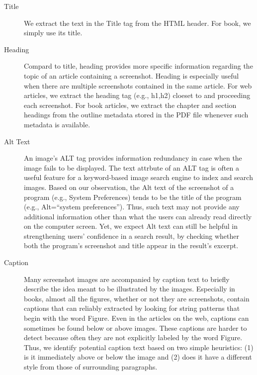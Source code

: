 \documentclass{www2010-submission}
\begin{document}
\begin{description}

\item[Title] We extract the text in the Title tag from the HTML
  header. For book, we simply use its title.

\item[Heading] Compard to title, heading provides more specific
  information regarding the topic of an article containing a
  screenshot. Heading is especially useful when there are multiple
  screenshots contained in the same article. For web articles, we
  extract the heading tag (e.g., h1,h2) cloeset to and proceeding each
  screenshot. For book articles, we extract the chapter and section
  headings from the outline metadata stored in the PDF file whenever
  such metadata is available.

\item[Alt Text] An image's ALT tag provides information redundancy in
  case when the image fails to be displayed. The text attrbute of an
  ALT tag is often a useful feature for a keyword-based image search
  engine to index and search images. Based on our observation, the Alt
  text of the screenshot of a program (e.g., System Preferences) tends
  to be the title of the program (e.g., Alt=``system preferences'').
  Thus, such text may not provide any additional information other
  than what the users can already read directly on the computer
  screen. Yet, we expect Alt text can still be helpful in
  strengthening users' confidence in a search result, by checking
  whether both the program's screenshot and title appear in the
  result's excerpt.

\item[Caption] Many screenshot images are accompanied by caption text
  to briefly describe the idea meant to be illustrated by the images.
  Especially in books, almost all the figures, whether or not they are
  screenshots, contain captions that can reliably extracted by looking
  for string patterns that begin with the word Figure.  Even in the
  articles on the web, captions can sometimes be found below or above
  images. These captions are harder to detect because often they are
  not explicitly labeled by the word Figure. Thus, we identify
  potential caption text based on two simple heuristics: (1) is it
  immediately above or below the image and (2) does it have a
  different style from those of surrounding paragraphs.


\end{description}
\end{document}
